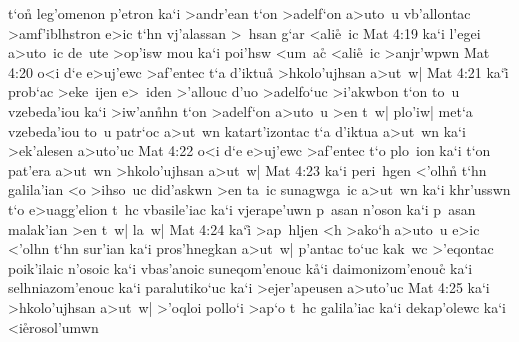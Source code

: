 t`on\r{}
leg'omenon
p'etron
ka`i
>andr'ean
t`on
>adelf`on
a>uto~u
vb'allontac
>amf'iblhstron
e>ic
t`hn
vj'alassan
>~hsan
g`ar
<ali\r{e}~ic\bibvsend
{}
\vs Mat 4:19
ka`i
l'egei
a>uto~ic
de~ute
>op'isw
mou
ka`i
poi'hsw
<um~a\r{c}
<ali\r{e}~ic
>anjr'wpwn\bibvsend
\vs Mat 4:20
o<i
d`e
e>uj'ewc
>af'entec
t`a
d'iktu\r{a}
>hkolo'ujhsan
a>ut~w|\bibvsend
\vs Mat 4:21
ka`i\r{}
prob`ac
>eke~ijen
e>~iden
>'allouc
d'uo
>adelfo`uc
>i'akwbon
t`on
to~u
vzebeda'iou
ka`i
>iw'an\r{n}hn
t`on
>adelf`on
a>uto~u
>en
t~w|
plo'iw|
met`a
vzebeda'iou
to~u
patr`oc
a>ut~wn
katart'izontac
t`a
d'iktua
a>ut~wn
ka`i
>ek'alesen
a>uto'uc\bibvsend
\vs Mat 4:22
o<i
d`e
e>uj'ewc
>af'entec
t`o
plo~ion
ka`i
t`on
pat'era
a>ut~wn
>hkolo'ujhsan
a>ut~w|\bibvsend
\vs Mat 4:23
ka`i
peri~hgen
<'olhn\r{}
t`hn
galila'ian
<o
>ihso~uc
did'askwn
>en
ta~ic
sunagwga~ic
a>ut~wn
ka`i
khr'usswn
t`o
e>uagg'elion
t~hc
vbasile'iac
ka`i
vjerape'uwn
p~asan
n'oson
ka`i
p~asan
malak'ian
>en
t~w|
la~w|\bibvsend
\vs Mat 4:24
ka`i\r{}
>ap~hljen
<h
>ako`h
a>uto~u
e>ic
<'olhn
t`hn
sur'ian
ka`i
pros'hnegkan
a>ut~w|
p'antac
to`uc
kak~wc
>'eqontac
poik'ilaic
n'osoic
ka`i
vbas'anoic
suneqom'enouc
k\r{a}`i
daimonizom'enouc\r{}
ka`i
selhniazom'enouc
ka`i
paralutiko`uc
ka`i
>ejer'apeusen
a>uto'uc\bibvsend
\vs Mat 4:25
ka`i
>hkolo'ujhsan
a>ut~w|
>'oqloi
pollo`i
>ap`o
t~hc
galila'iac
ka`i
dekap'olewc
ka`i
<i\r{e}rosol'umwn
